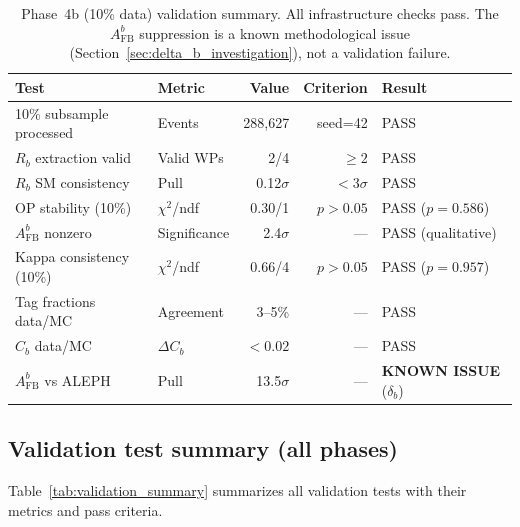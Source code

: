 \documentclass[11pt,a4paper]{article}
\begin{document}
\begin{table}[htbp]
\centering
\caption{Phase~4b (10\% data) validation summary. All infrastructure checks pass.
The $A_\mathrm{FB}^b$ suppression is a known methodological issue
(Section~\ref{sec:delta_b_investigation}), not a validation failure.}
\label{tab:validation_10pct}
\small
\begin{tabular}{llrrl}
\toprule
Test & Metric & Value & Criterion & Result \\
\midrule
10\% subsample processed & Events & 288,627 & seed=42 & PASS \\
$R_b$ extraction valid & Valid WPs & 2/4 & $\geq 2$ & PASS \\
$R_b$ SM consistency & Pull & 0.12$\sigma$ & $< 3\sigma$ & PASS \\
OP stability (10\%) & $\chi^2$/ndf & 0.30/1 & $p > 0.05$ & PASS ($p = 0.586$) \\
$A_\mathrm{FB}^b$ nonzero & Significance & 2.4$\sigma$ & --- & PASS (qualitative) \\
Kappa consistency (10\%) & $\chi^2$/ndf & 0.66/4 & $p > 0.05$ & PASS ($p = 0.957$) \\
Tag fractions data/MC & Agreement & 3--5\% & --- & PASS \\
$C_b$ data/MC & $\Delta C_b$ & $< 0.02$ & --- & PASS \\
$A_\mathrm{FB}^b$ vs ALEPH & Pull & 13.5$\sigma$ & --- & \textbf{KNOWN ISSUE} ($\delta_b$) \\
\bottomrule
\end{tabular}
\end{table}

\subsection{Validation test summary (all phases)}
\label{sec:validation_summary}

Table~\ref{tab:validation_summary} summarizes all validation tests with their metrics
and pass criteria.
\end{document}
